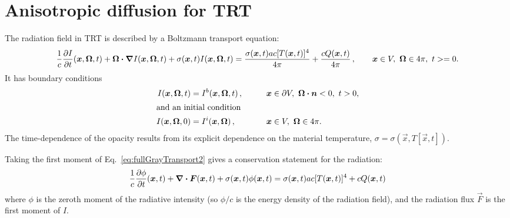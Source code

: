 
\newcommand{\epsiloncolor}[1]{#1}
\chapter{Anisotropic diffusion for TRT}
The radiation field in TRT is described by a Boltzmann transport equation:
\begin{equation}\label{eq:fullGrayTransport2}
  \frac{1}{c} \frac{\partial I}{\partial t}(\bm{x}, \bm{\Omega}, t)
  + \bm{\Omega} \bm{\cdot} \bm{\nabla} I(\bm{x}, \bm{\Omega}, t) +
 \sigma(\bm{x}, t) I(\bm{x}, \bm{\Omega}, t)
  = \frac{\sigma(\bm{x}, t) a c [T(\bm{x},t)]^4}{4\pi} 
  + \frac{c Q(\bm{x},t)}{4\pi} \,, \qquad \bm{x} \in V, \ \bm{\Omega} \in
  4\pi, \ t >= 0.
\end{equation}
It has boundary conditions
\begin{alignat*}{3}
  I(\bm{x}, \bm{\Omega}, t) &= I^b(\bm{x}, \bm{\Omega}, t) \,, &\qquad&
  \bm{x} \in \partial V, \  \bm{\Omega}\bm{\cdot} \bm{n} < 0, \ t > 0,
  \\
  \intertext{and an initial condition}
  I(\bm{x}, \bm{\Omega}, 0) &= I^i(\bm{x}, \bm{\Omega}) \,, &&
  \bm{x} \in V,\ \bm{\Omega} \in 4\pi.
\end{alignat*}
The time-dependence of the opacity results from its explicit dependence on
the material temperature, $\sigma = \sigma(\vec{x}, T[\vec{x},t])$.

Taking the first moment of Eq.~\eqref{eq:fullGrayTransport2} gives a
conservation statement for the radiation:
\begin{equation} \label{eq:grayTransportZeroth}
  \frac{1}{c} \frac{\partial \phi}{\partial t}(\bm{x}, t)
  +\bm{\nabla} \bm{\cdot} \bm{F}(\bm{x}, t) +
 \sigma(\bm{x}, t) \phi(\bm{x}, t)
  = \sigma(\bm{x}, t) a c [T(\bm{x},t)]^4
  + c Q(\bm{x},t)
\end{equation}
where $\phi$ is the zeroth moment of the radiative intensity (so $\phi/c$ is
the energy density of the radiation field), and the radiation flux $\vec{F}$ is
the first moment of $I$.

